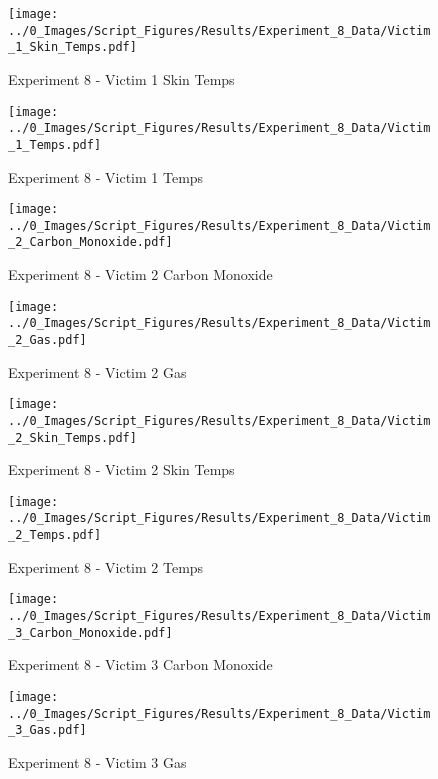 	\clearpage

	\begin{figure}[H]
		\centering
		\texttt{[image: ../0\_Images/Script\_Figures/Results/Experiment\_8\_Data/Victim\_1\_Skin\_Temps.pdf]}
		\caption[]{Experiment 8 - Victim 1 Skin Temps}
	\end{figure}
 

	\begin{figure}[H]
		\centering
		\texttt{[image: ../0\_Images/Script\_Figures/Results/Experiment\_8\_Data/Victim\_1\_Temps.pdf]}
		\caption[]{Experiment 8 - Victim 1 Temps}
	\end{figure}
 
	\clearpage

	\begin{figure}[H]
		\centering
		\texttt{[image: ../0\_Images/Script\_Figures/Results/Experiment\_8\_Data/Victim\_2\_Carbon\_Monoxide.pdf]}
		\caption[]{Experiment 8 - Victim 2 Carbon Monoxide}
	\end{figure}
 

	\begin{figure}[H]
		\centering
		\texttt{[image: ../0\_Images/Script\_Figures/Results/Experiment\_8\_Data/Victim\_2\_Gas.pdf]}
		\caption[]{Experiment 8 - Victim 2 Gas}
	\end{figure}
 
	\clearpage

	\begin{figure}[H]
		\centering
		\texttt{[image: ../0\_Images/Script\_Figures/Results/Experiment\_8\_Data/Victim\_2\_Skin\_Temps.pdf]}
		\caption[]{Experiment 8 - Victim 2 Skin Temps}
	\end{figure}
 

	\begin{figure}[H]
		\centering
		\texttt{[image: ../0\_Images/Script\_Figures/Results/Experiment\_8\_Data/Victim\_2\_Temps.pdf]}
		\caption[]{Experiment 8 - Victim 2 Temps}
	\end{figure}
 
	\clearpage

	\begin{figure}[H]
		\centering
		\texttt{[image: ../0\_Images/Script\_Figures/Results/Experiment\_8\_Data/Victim\_3\_Carbon\_Monoxide.pdf]}
		\caption[]{Experiment 8 - Victim 3 Carbon Monoxide}
	\end{figure}
 

	\begin{figure}[H]
		\centering
		\texttt{[image: ../0\_Images/Script\_Figures/Results/Experiment\_8\_Data/Victim\_3\_Gas.pdf]}
		\caption[]{Experiment 8 - Victim 3 Gas}
	\end{figure}
 
